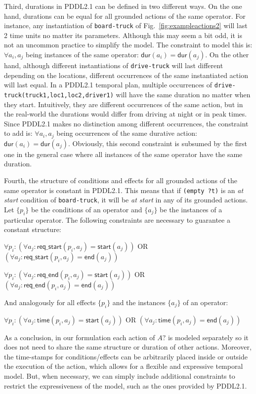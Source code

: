 \documentclass{ecai}
\newcommand{\dur}{\mathsf{dur}}    %
\newcommand{\start}{\mathsf{start}}%
\newcommand{\en}{\mathsf{end}}     %
\newcommand{\tim}{\mathsf{time}}   %
\newcommand{\reqs}{\mathsf{req\_{start}}} %
\newcommand{\reqe}{\mathsf{req\_{end}}}   %
\begin{document}
Third, durations in PDDL2.1 can be defined in two different ways. On the one hand, durations can be equal for all grounded actions of the same operator. For instance, any instantiation of \texttt{board-truck} of Fig.~\ref{fig:exampleactions2} will last 2 time units no matter its parameters. Although this may seem a bit odd, it is not an uncommon practice to simplify the model. The constraint to model this is: $\forall a_i,a_j$ being instances of the same operator: $\dur(a_i) = \dur(a_j)$.
On the other hand, although different instantiations of \texttt{drive-truck} will last different depending on the locations, different occurrences of the same instantiated action will last equal.
In a PDDL2.1 temporal plan, multiple occurrences of \texttt{drive-truck(truck1,loc1,loc2,driver1)} will have the same duration no matter when they start. Intuitively, they are different occurrences of the same action, but in the real-world the durations would differ from driving at night or in peak times. Since PDDL2.1 makes no distinction among different occurrences, the constraint to add is: $\forall a_i,a_j$ being occurrences of the same durative action: $\dur(a_i) = \dur(a_j)$.
Obviously, this second constraint is subsumed by the first one in the general case where all instances of the same operator have the same duration.

Fourth, the structure of conditions and effects for all grounded actions of the same operator is constant in PDDL2.1. This means that if \texttt{(empty ?t)} is an \emph{at start} condition of \texttt{board-truck}, it will be \emph{at start} in any of its grounded actions.
Let $\{p_i\}$ be the conditions of an operator and $\{a_j\}$ be the instances of a particular operator. The following constraints are necessary to guarantee a constant structure:

$\forall p_i: (\forall a_j: \reqs(p_i,a_j) = \start(a_j))$ OR $(\forall a_j: \reqs(p_i,a_j) = \en(a_j))$

$\forall p_i: (\forall a_j: \reqe(p_i,a_j) = \start(a_j))$ OR $(\forall a_j: \reqe(p_i,a_j) = \en(a_j))$

And analogously for all effects $\{p_i\}$ and the instances $\{a_j\}$ of an operator:

$\forall p_i: (\forall a_j: \tim(p_i,a_j) = \start(a_j))$ OR $(\forall a_j: \tim(p_i,a_j) = \en(a_j))$


As a conclusion, in our formulation each action of $A?$ is modeled separately so it does not need to share the same structure or duration of other actions. Moreover, the time-stamps for conditions/effects can be arbitrarily placed inside or outside the execution of the action, which allows for a flexible and expressive temporal model. But, when necessary, we can simply include additional constraints to restrict the expressiveness of the model, such as the ones provided by PDDL2.1.
\end{document}

